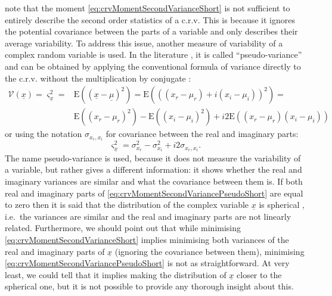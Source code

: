 \documentclass[
]{book}
\begin{document}
\citet{Picinbono1997} note that the moment \eqref{eq:crvMomentSecondVarianceShort} is not sufficient to entirely describe the second order statistics of a c.r.v. This is because it ignores the potential covariance between the parts of a variable and only describes their average variability. To address this issue, another measure of variability of a complex random variable is used. In the literature \citep[especially in signal processing, for example, in][]{Javidi2011}, it is called ``pseudo-variance'' and can be obtained by applying the conventional formula of variance directly to the c.r.v. without the multiplication by conjugate \citep[e.g.,][]{Trampitsch2013}:
\begin{equation}
    \begin{aligned}
    \mathcal{V}(\underline{x}) = \varsigma_{\underline{x}}^2 = & \mathrm{E}((\underline{x}-\underline{\mu})^2) = \mathrm{E}\left(((x_r-\mu_{r}) + i (x_i-\mu_{i}))^2\right) = \\
                    & \mathrm{E}((x_r-\mu_{r})^2) - \mathrm{E}((x_i-\mu_{i})^2) + i2 \mathrm{E}((x_r-\mu_{r})(x_i-\mu_{i}))
    \end{aligned}
    \label{eq:crvMomentSecondVariancePseudo}
\end{equation}
or using the notation \(\sigma_{x_r,x_i}\) for covariance between the real and imaginary parts:
\begin{equation}
    \varsigma_{\underline{x}}^2 = \sigma_{x_r}^2 - \sigma_{x_i}^2 + i2 \sigma_{x_r,x_i}.
    \label{eq:crvMomentSecondVariancePseudoShort}
\end{equation}
The name pseudo-variance is used, because it does not measure the variability of a variable, but rather gives a different information: it shows whether the real and imaginary variances are similar and what the covariance between them is. If both real and imaginary parts of \eqref{eq:crvMomentSecondVariancePseudoShort} are equal to zero then it is said that the distribution of the complex variable \(\underline{x}\) is spherical \citep{Neeser1993}, i.e.~the variances are similar and the real and imaginary parts are not linearly related. Furthermore, we should point out that while minimising \eqref{eq:crvMomentSecondVarianceShort} implies minimising both variances of the real and imaginary parts of \(\underline{x}\) (ignoring the covariance between them), minimising \eqref{eq:crvMomentSecondVariancePseudoShort} is not as straightforward. At very least, we could tell that it implies making the distribution of \(\underline{x}\) closer to the spherical one, but it is not possible to provide any thorough insight about this.
\end{document}
